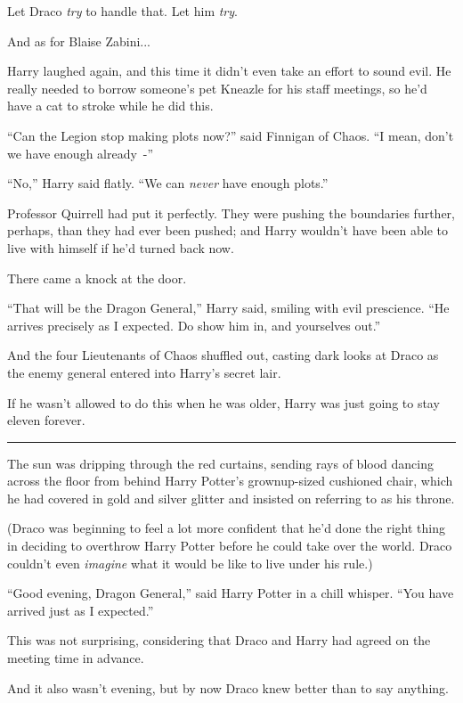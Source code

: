 Let Draco \emph{try} to handle that. Let him \emph{try}.

And as for Blaise Zabini...

Harry laughed again, and this time it didn't even take an effort to sound evil. He really needed to borrow someone's pet Kneazle for his staff meetings, so he'd have a cat to stroke while he did this.

``Can the Legion stop making plots now?'' said Finnigan of Chaos. ``I mean, don't we have enough already~-''

``No,'' Harry said flatly. ``We can \emph{never} have enough plots.''

Professor Quirrell had put it perfectly. They were pushing the boundaries further, perhaps, than they had ever been pushed; and Harry wouldn't have been able to live with himself if he'd turned back now.

There came a knock at the door.

``That will be the Dragon General,'' Harry said, smiling with evil prescience. ``He arrives precisely as I expected. Do show him in, and yourselves out.''

And the four Lieutenants of Chaos shuffled out, casting dark looks at Draco as the enemy general entered into Harry's secret lair.

If he wasn't allowed to do this when he was older, Harry was just going to stay eleven forever.

\begin{center}\rule{3in}{0.4pt}\end{center}

The sun was dripping through the red curtains, sending rays of blood dancing across the floor from behind Harry Potter's grownup-sized cushioned chair, which he had covered in gold and silver glitter and insisted on referring to as his throne.

(Draco was beginning to feel a lot more confident that he'd done the right thing in deciding to overthrow Harry Potter before he could take over the world. Draco couldn't even \emph{imagine} what it would be like to live under his rule.)

``Good evening, Dragon General,'' said Harry Potter in a chill whisper. ``You have arrived just as I expected.''

This was not surprising, considering that Draco and Harry had agreed on the meeting time in advance.

And it also wasn't evening, but by now Draco knew better than to say anything.

